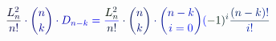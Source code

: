 \documentclass[12pt]{article}
\begin{document}
\makeatletter
\renewcommand*{\@textcolor}[3]{%
  \protect\leavevmode
  \begingroup
    \color#1{#2}#3%
  \endgroup
}
\makeatother
\begin{displaymath}
\mathcolor[RGB]{0,0,15}{\frac { \mathcolor[RGB]{0,0,30}{L} _ { \mathcolor[RGB]{0,0,45}{n} } ^ { \mathcolor[RGB]{0,0,60}{2} } } { \mathcolor[RGB]{0,0,75}{n} \mathcolor[RGB]{0,0,90}{!} } } \mathcolor[RGB]{0,0,105}{\cdot} \mathcolor[RGB]{0,0,120}{\binom { \mathcolor[RGB]{0,0,135}{n} } { \mathcolor[RGB]{0,0,150}{k} } } \mathcolor[RGB]{0,0,165}{\cdot} \mathcolor[RGB]{0,0,180}{D} _ { \mathcolor[RGB]{0,0,195}{n} \mathcolor[RGB]{0,0,210}{-} \mathcolor[RGB]{0,0,225}{k} } \mathcolor[RGB]{0,0,240}{=} \mathcolor[RGB]{0,0,255}{\frac { \mathcolor[RGB]{0,15,0}{L} _ { \mathcolor[RGB]{0,15,15}{n} } ^ { \mathcolor[RGB]{0,15,30}{2} } } { \mathcolor[RGB]{0,15,45}{n} \mathcolor[RGB]{0,15,60}{!} } } \mathcolor[RGB]{0,15,75}{\cdot} \mathcolor[RGB]{0,15,90}{\binom { \mathcolor[RGB]{0,15,105}{n} } { \mathcolor[RGB]{0,15,120}{k} } } \mathcolor[RGB]{0,15,135}{\cdot} \mathcolor[RGB]{0,15,150}{\binom { \mathcolor[RGB]{0,15,165}{n} \mathcolor[RGB]{0,15,180}{-} \mathcolor[RGB]{0,15,195}{k} } { \mathcolor[RGB]{0,15,210}{i} \mathcolor[RGB]{0,15,225}{=} \mathcolor[RGB]{0,15,240}{0} } } \mathcolor[RGB]{0,15,255}{(} \mathcolor[RGB]{0,30,0}{-} \mathcolor[RGB]{0,30,15}{1} \mathcolor[RGB]{0,30,30}{)} ^ { \mathcolor[RGB]{0,30,45}{i} } \mathcolor[RGB]{0,30,60}{\frac { \mathcolor[RGB]{0,30,75}{(} \mathcolor[RGB]{0,30,90}{n} \mathcolor[RGB]{0,30,105}{-} \mathcolor[RGB]{0,30,120}{k} \mathcolor[RGB]{0,30,135}{)} \mathcolor[RGB]{0,30,150}{!} } { \mathcolor[RGB]{0,30,165}{i} \mathcolor[RGB]{0,30,180}{!} } }
\end{displaymath}
\end{document}
